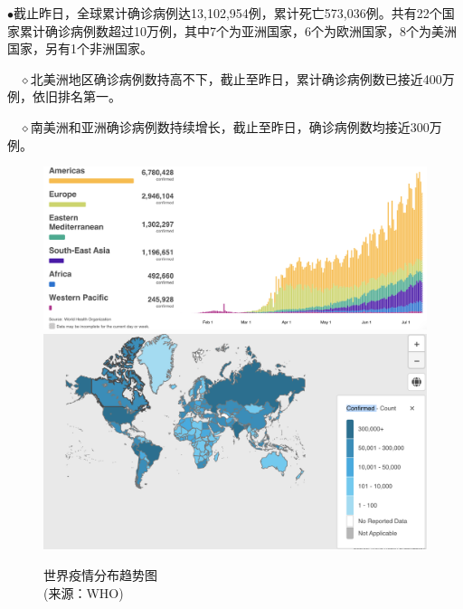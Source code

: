\documentclass[]{article}
\begin{document}
\(\bullet\)截止昨日，全球累计确诊病例达13,102,954例，累计死亡573,036例。共有22个国家累计确诊病例数超过10万例，其中7个为亚洲国家，6个为欧洲国家，8个为美洲国家，另有1个非洲国家。

\(\quad\)\(\diamond\)北美洲地区确诊病例数持高不下，截止至昨日，累计确诊病例数已接近400万例，依旧排名第一。

\(\quad\)\(\diamond\)南美洲和亚洲确诊病例数持续增长，截止至昨日，确诊病例数均接近300万例。

\begin{figure}[H]
\caption{世界疫情分布趋势图\\ \vspace{-3mm}(来源：WHO)} %
\centering
\includegraphics[]{./input/covid1.png} %
\includegraphics[]{./input/covid4.png}
\label{} %
\end{figure}
\end{document}
